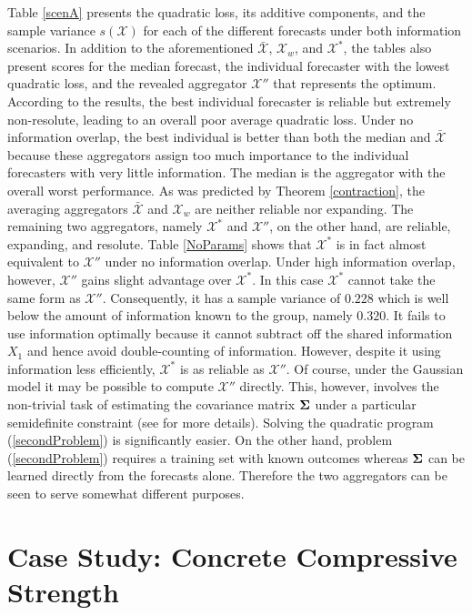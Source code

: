 \documentclass[11pt]{article}
\theoremstyle{definition}
\theoremstyle{definition}
\def\bSigma{{\bf \Sigma}}
\begin{document}
Table \ref{scenA} presents the quadratic loss, its additive components, and the sample variance $s(\boldsymbol{\mathcal{X}} )$ for each of the different forecasts under both information scenarios. In addition to the aforementioned $\bar{\mathcal{X}}$, $\mathcal{X}_w$, and $\mathcal{X}^*$, the tables also present scores for the median forecast,  the individual forecaster with the lowest quadratic loss, and the revealed aggregator $\mathcal{X}''$ that represents the optimum. According to the results, the best individual forecaster is reliable but extremely non-resolute, leading to an overall poor average quadratic loss. Under no information overlap, the best individual is better than both the median and $\bar{\mathcal{X}}$ because these aggregators assign too much importance to the individual forecasters with very little information. The median is the aggregator with the overall worst performance.  As was predicted by Theorem \ref{contraction},  the averaging aggregators $\bar{\mathcal{X}}$ and $\mathcal{X}_w$ are neither reliable nor expanding.  The remaining two aggregators, namely $\mathcal{X}^*$ and $\mathcal{X}''$, on the other hand, are reliable, expanding, and resolute. Table \ref{NoParams} shows that $\mathcal{X}^*$ is in fact  almost equivalent to $\mathcal{X}''$ under no information overlap. Under high information overlap, however, $\mathcal{X}''$ gains slight advantage over $\mathcal{X}^*$. In this case $\mathcal{X}^*$ cannot take the same form as $\mathcal{X}''$. Consequently, it has a sample variance of $0.228$ which is well below the  amount of information known to the group, namely $0.320$. It fails to use information optimally because it cannot subtract off the shared information $X_1$ and hence avoid double-counting of information. However, despite it using information less efficiently, $\mathcal{X}^*$ is as reliable as $\mathcal{X}''$. Of course, under the Gaussian model it may be possible to compute $\mathcal{X}''$ directly. This, however, involves the non-trivial task of estimating the covariance matrix $\bSigma$ under a particular semidefinite constraint (see \citealt{satopaamodeling2} for more details). Solving the quadratic program (\ref{secondProblem}) is significantly easier. On the other hand, problem (\ref{secondProblem}) requires a training set with known outcomes whereas $\bSigma$ can be learned directly from the forecasts alone. Therefore the two aggregators can be seen to serve somewhat different purposes. 


\section{Case Study: Concrete Compressive Strength} \label{application}
\end{document}
